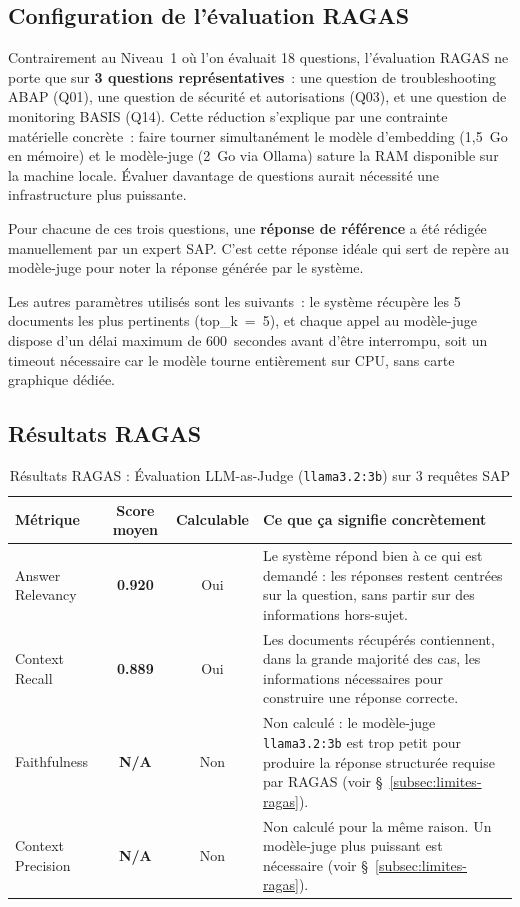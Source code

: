 \subsection{Configuration de l'évaluation RAGAS}

Contrairement au Niveau~1 où l'on évaluait 18 questions, l'évaluation RAGAS ne porte que sur \textbf{3 questions représentatives}~: une question de troubleshooting ABAP (Q01), une question de sécurité et autorisations (Q03), et une question de monitoring BASIS (Q14). Cette réduction s'explique par une contrainte matérielle concrète~: faire tourner simultanément le modèle d'embedding (1,5~Go en mémoire) et le modèle-juge (2~Go via Ollama) sature la RAM disponible sur la machine locale. Évaluer davantage de questions aurait nécessité une infrastructure plus puissante.

Pour chacune de ces trois questions, une \textbf{réponse de référence} a été rédigée manuellement par un expert SAP. C'est cette réponse idéale qui sert de repère au modèle-juge pour noter la réponse générée par le système.

Les autres paramètres utilisés sont les suivants~: le système récupère les 5 documents les plus pertinents (top\_k~=~5), et chaque appel au modèle-juge dispose d'un délai maximum de 600~secondes avant d'être interrompu, soit un timeout nécessaire car le modèle tourne entièrement sur CPU, sans carte graphique dédiée.

\subsection{Résultats RAGAS}

\begin{table}[H]
\centering
\caption{Résultats RAGAS : Évaluation LLM-as-Judge (\texttt{llama3.2:3b}) sur 3 requêtes SAP}
\label{tab:ragas-results}
\begin{tabular}{|l|c|c|p{6.5cm}|}
\hline
\textbf{Métrique} & \textbf{Score moyen} & \textbf{Calculable} & \textbf{Ce que ça signifie concrètement} \\
\hline
Answer Relevancy & \textbf{0.920} & Oui
  & Le système répond bien à ce qui est demandé : les réponses restent centrées sur la question, sans partir sur des informations hors-sujet. \\
\hline
Context Recall & \textbf{0.889} & Oui
  & Les documents récupérés contiennent, dans la grande majorité des cas, les informations nécessaires pour construire une réponse correcte. \\
\hline
Faithfulness & \textbf{N/A} & Non
  & Non calculé : le modèle-juge \texttt{llama3.2:3b} est trop petit pour produire la réponse structurée requise par RAGAS (voir §~\ref{subsec:limites-ragas}). \\
\hline
Context Precision & \textbf{N/A} & Non
  & Non calculé pour la même raison. Un modèle-juge plus puissant est nécessaire (voir §~\ref{subsec:limites-ragas}). \\
\hline
\end{tabular}
\end{table}

